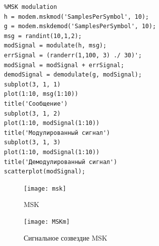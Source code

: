 \documentclass[10pt,a4paper]{article}
\begin{document}
\FloatBarrier
\begin{verbatim}
%MSK modulation
h = modem.mskmod('SamplesPerSymbol', 10);
g = modem.mskdemod('SamplesPerSymbol', 10);
msg = randint(10,1,2);
modSignal = modulate(h, msg);
errSignal = (randerr(1,100, 3) ./ 30)';
modSignal = modSignal + errSignal;
demodSignal = demodulate(g, modSignal);
subplot(3, 1, 1)
plot(1:10, msg(1:10))
title('Сообщение')
subplot(3, 1, 2)
plot(1:10, modSignal(1:10))
title('Модулированный сигнал')
subplot(3, 1, 3)
plot(1:10, modSignal(1:10))
title('Демодулированный сигнал')
scatterplot(modSignal);
\end{verbatim}
\begin{figure}[h]\centering
	\texttt{[image: msk]}
	\caption{MSK}\label{fig.msk}
\end{figure}
\begin{figure}[h]\centering
	\texttt{[image: MSKm]}
	\caption{Сигнальное созвездие MSK}\label{fig.MSKm}
\end{figure}                                                                                                                                                                                                                                                                                                                                                                                                                                                                                                                                                                                                                                                                                                                                                                                                                                                                                                                                                                                                                                                                                                                                                                                                                                                                                                                                                                                                                                                                        
\end{document}
